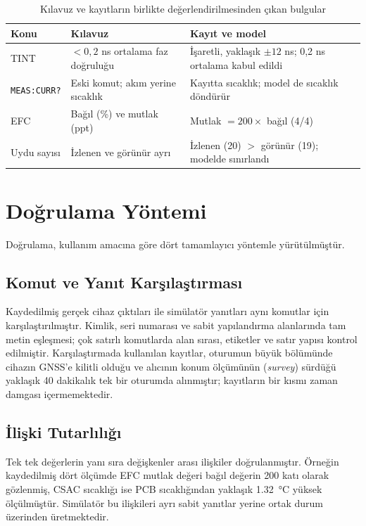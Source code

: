 \documentclass[9pt,twocolumn,a4paper]{extarticle}
\begin{document}
\begin{table}[t]
\caption{Kılavuz ve kayıtların birlikte değerlendirilmesinden çıkan bulgular}
\label{tab:findings}
\centering
\fontsize{9}{10.8}\selectfont
\setlength{\tabcolsep}{3pt}
\begin{tabular}{>{\raggedright\arraybackslash}p{}>{\raggedright\arraybackslash}p{}>{\raggedright\arraybackslash}p{}}
\toprule
\textbf{Konu} & \textbf{Kılavuz} & \textbf{Kayıt ve model} \\
\midrule
TINT & $<0{,}2$ ns ortalama faz doğruluğu & İşaretli, yaklaşık $\pm12$ ns; 0,2 ns ortalama kabul edildi \\
\texttt{MEAS:CURR?} & Eski komut; akım yerine sıcaklık & Kayıtta sıcaklık; model de sıcaklık döndürür \\
EFC & Bağıl (\%) ve mutlak (ppt) & Mutlak $=200\times$ bağıl (4/4) \\
Uydu sayısı & İzlenen ve görünür ayrı & İzlenen (20) $>$ görünür (19); modelde sınırlandı \\
\bottomrule
\end{tabular}
\end{table}

\section{Doğrulama Yöntemi}
Doğrulama, kullanım amacına göre dört tamamlayıcı yöntemle yürütülmüştür.

\subsection{Komut ve Yanıt Karşılaştırması}
Kaydedilmiş gerçek cihaz çıktıları ile simülatör yanıtları aynı komutlar için karşılaştırılmıştır. Kimlik, seri numarası ve sabit yapılandırma alanlarında tam metin eşleşmesi; çok satırlı komutlarda alan sırası, etiketler ve satır yapısı kontrol edilmiştir.
Karşılaştırmada kullanılan kayıtlar, oturumun büyük bölümünde cihazın GNSS'e kilitli olduğu ve alıcının konum ölçümünün (\emph{survey}) sürdüğü yaklaşık 40 dakikalık tek bir oturumda alınmıştır; kayıtların bir kısmı zaman damgası içermemektedir.

\subsection{İlişki Tutarlılığı}
Tek tek değerlerin yanı sıra değişkenler arası ilişkiler doğrulanmıştır. Örneğin kaydedilmiş dört ölçümde EFC mutlak değeri bağıl değerin 200 katı olarak gözlenmiş, CSAC sıcaklığı ise PCB sıcaklığından yaklaşık \SI{1.32}{\celsius} yüksek ölçülmüştür. Simülatör bu ilişkileri ayrı sabit yanıtlar yerine ortak durum üzerinden üretmektedir.
\end{document}
